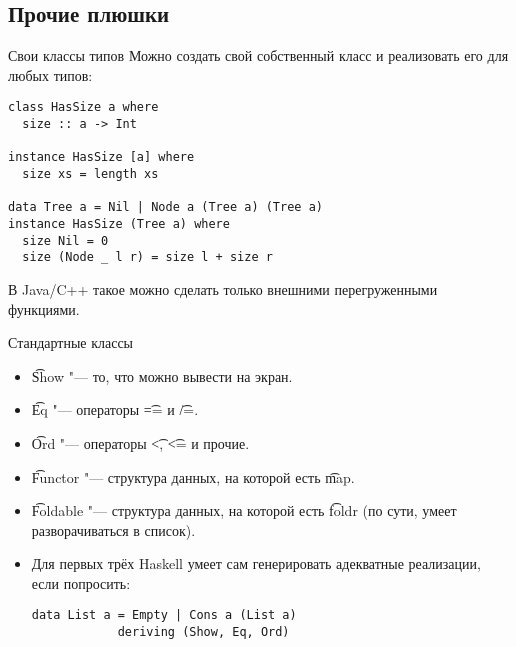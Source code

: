 \subsection{Прочие плюшки}
\begin{frame}[fragile]{Свои классы типов}
	Можно создать свой собственный класс и реализовать его для любых типов:
\begin{verbatim}
class HasSize a where
  size :: a -> Int

instance HasSize [a] where
  size xs = length xs

data Tree a = Nil | Node a (Tree a) (Tree a)
instance HasSize (Tree a) where
  size Nil = 0
  size (Node _ l r) = size l + size r
\end{verbatim}
	В Java/C++ такое можно сделать только внешними перегруженными функциями.
\end{frame}

\begin{frame}[fragile]{Стандартные классы}
	\begin{itemize}
		\item \t{Show} "--- то, что можно вывести на экран.
		\item \t{Eq} "--- операторы \t{==} и \t{/=}.
		\item \t{Ord} "--- операторы \t{<}, \t{<=} и прочие.
		\item \t{Functor} "--- структура данных, на которой есть \t{map}.
		\item \t{Foldable} "--- структура данных, на которой есть \t{foldr} (по сути, умеет разворачиваться в список).
		\item Для первых трёх Haskell умеет сам генерировать адекватные реализации, если попросить:
\begin{verbatim}
data List a = Empty | Cons a (List a)
            deriving (Show, Eq, Ord)
\end{verbatim}
	\end{itemize}
\end{frame}


